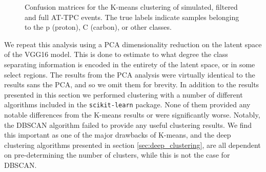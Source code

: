 \begin{figure}
\centering
\caption[Pre-trained network - confusion matrices]{Confusion matrices for the K-means clustering of simulated, filtered and full AT-TPC events. The true labels indicate samples belonging to the p (proton), C (carbon), or other classes. }\label{fig:clster_confmat}
	\hspace{-1cm}
	\hspace{-1cm}
\end{figure}

We repeat this analysis using a PCA dimensionality reduction on the latent space of the VGG16 model. This is done to estimate to what degree the class separating information is encoded in the entirety of the latent space, or in some select regions. The results from the PCA analysis were virtually identical to the results sans the PCA, and so we omit them for brevity. In addition to the results presented in this section we performed clustering with a number of different algorithms included in the \lstinline{scikit-learn} package. None of them provided any notable differences from the K-means results or were significantly worse. Notably, the DBSCAN algorithm failed to provide any useful clustering results. We find this important as one of the major drawbacks of K-means, and the deep clustering algorithms presented in section \ref{sec:deep_clustering}, are all dependent on pre-determining the number of clusters, while this is not the case for DBSCAN. 